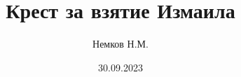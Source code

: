 

\title{Крест за взятие Измаила}
\author{Немков Н.М.}
\date{30.09.2023}



\begin{frame}
\maketitle
\end{frame}

\section{}

